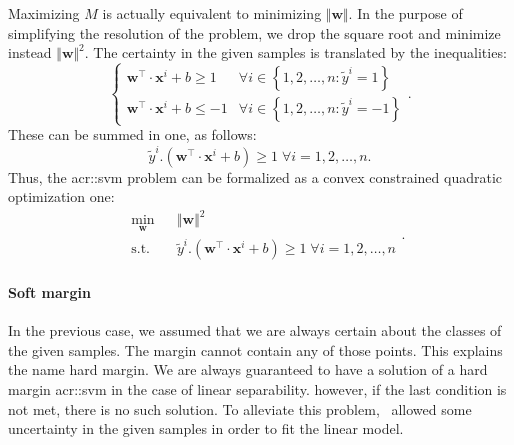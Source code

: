                 Maximizing $M$ is actually equivalent to minimizing $\Vert\bm{w}\Vert$.
                In the purpose of simplifying the resolution of the problem, we drop the square root and minimize instead $\Vert\bm{w}\Vert^2$.
                The certainty in the given samples is translated by the inequalities:
                \begin{equation*}
                    \begin{cases}
                        \bm{w}^\intercal\cdot\bm{x}^i + b \geq 1 & \forall i \in \left\{1, 2, \dots, n: \tilde{y}^i = 1\right\}\\
                        \bm{w}^\intercal\cdot\bm{x}^i + b \leq -1 & \forall i \in \left\{1, 2, \dots, n: \tilde{y}^i = -1\right\}
                    \end{cases}.
                \end{equation*}
                These can be summed in one, as follows:
                \begin{equation}
                    \label{eq::hard_margin}
                    \tilde{y}^i.(\bm{w}^\intercal\cdot\bm{x}^i + b) \geq 1 \; \forall i = 1, 2, \dots, n.
                \end{equation}
                Thus, the \gls{acr::svm} problem can be formalized as a convex constrained quadratic optimization one:
                \begin{equation}
                    \label{eq::hard_svm_primal}
                    \begin{aligned}
                        & \min_{\bm{w}}
                        & & {\Vert \bm{w} \Vert}^2 \\
                        & \text{s.t.}
                        & & \tilde{y}^i.(\bm{w}^\intercal\cdot\bm{x}^i + b) \geq 1 \; \forall i = 1, 2, \dots, n
                    \end{aligned}.
                \end{equation}

            \paragraph{Soft margin}
                In the previous case, we assumed that we are always certain about the classes of the given samples.
                The margin cannot contain any of those points.
                This explains the name hard margin.
                We are always guaranteed to have a solution of a hard margin \gls{acr::svm} in the case of linear separability.
                however, if the last condition is not met, there is no such solution.
                To alleviate this problem,~\textcite{cortes1995support} allowed some uncertainty in the given samples in order to fit the linear model.\\

